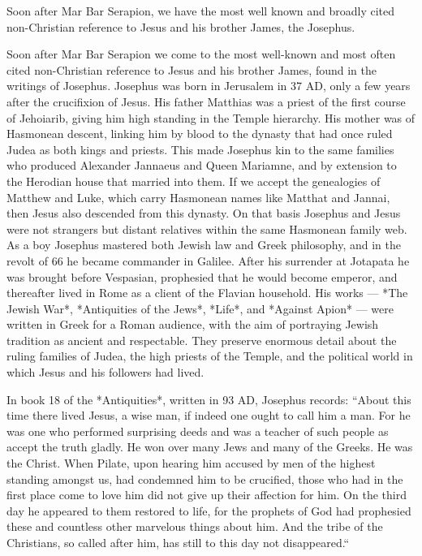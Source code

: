 Soon after Mar Bar Serapion, we have the most well known and broadly cited non-Christian reference to Jesus and his brother James, the Josephus.

Soon after Mar Bar Serapion we come to the most well-known and most often cited non-Christian reference to Jesus and his brother James, found in the writings of Josephus.
Josephus was born in Jerusalem in 37 AD, only a few years after the crucifixion of Jesus.
His father Matthias was a priest of the first course of Jehoiarib, giving him high standing in the Temple hierarchy.
His mother was of Hasmonean descent, linking him by blood to the dynasty that had once ruled Judea as both kings and priests.
This made Josephus kin to the same families who produced Alexander Jannaeus and Queen Mariamne, and by extension to the Herodian house that married into them.
If we accept the genealogies of Matthew and Luke, which carry Hasmonean names like Matthat and Jannai, then Jesus also descended from this dynasty.
On that basis Josephus and Jesus were not strangers but distant relatives within the same Hasmonean family web.
As a boy Josephus mastered both Jewish law and Greek philosophy, and in the revolt of 66 he became commander in Galilee.
After his surrender at Jotapata he was brought before Vespasian, prophesied that he would become emperor, and thereafter lived in Rome as a client of the Flavian household.
His works — *The Jewish War*, *Antiquities of the Jews*, *Life*, and *Against Apion* — were written in Greek for a Roman audience, with the aim of portraying Jewish tradition as ancient and respectable.
They preserve enormous detail about the ruling families of Judea, the high priests of the Temple, and the political world in which Jesus and his followers had lived.

In book 18 of the *Antiquities*, written in 93 AD, Josephus records:
``About this time there lived Jesus, a wise man, if indeed one ought to call him a man.
For he was one who performed surprising deeds and was a teacher of such people as accept the truth gladly.
He won over many Jews and many of the Greeks.
He was the Christ.
When Pilate, upon hearing him accused by men of the highest standing amongst us, had condemned him to be crucified, those who had in the first place come to love him did not give up their affection for him.
On the third day he appeared to them restored to life, for the prophets of God had prophesied these and countless other marvelous things about him.
And the tribe of the Christians, so called after him, has still to this day not disappeared.``

